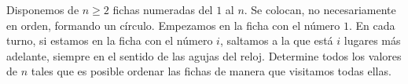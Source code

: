 Disponemos de $n \geq 2$ fichas numeradas del $1$ al $n$. Se colocan, no necesariamente en orden, formando un círculo. Empezamos en la ficha con el número $1$.
En cada turno, si estamos en la ficha con el número $i$, saltamos a la que está $i$ lugares más adelante, siempre en el sentido de las agujas del reloj. Determine todos los valores de $n$ tales que es posible ordenar las fichas de manera que visitamos todas ellas.